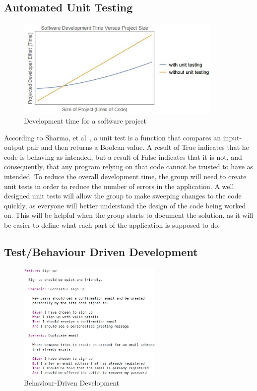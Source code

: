 \subsection{Automated Unit Testing}

\begin{figure}
  \centering
  \begin{minipage}{7cm}
    \centering
    \includegraphics[width=10cm]{inc/automated_unit_testing.jpg}
    \caption{Development time for a software project}
    \label{fig:automated_unit_testing}
  \end{minipage}
\end{figure}

According to Sharma, et al~\parencite{rep:unit_testing_validation}, a unit test is a function that compares an input-output pair and then returns a Boolean value. A result of True indicates that he code is behaving as intended, but a result of False indicates that it is not, and consequently, that any program relying on that code cannot be trusted to have as intended. To reduce the overall development time, the group will need to create unit tests in order to reduce the number of errors in the application. A well designed unit tests will allow the group to make sweeping changes to the code quickly, as everyone will better understand the design of the code being worked on. This will be helpful when the group starts to document the solution, as it will be easier to define what each part of the application is supposed to do.

\subsection{Test/Behaviour Driven Development}

\begin{figure}
  \centering
  \begin{minipage}{7cm}
    \centering
    \includegraphics[width=7cm]{inc/behaviour_driven_development.jpg}
    \caption{Behaviour-Driven Development}
    \label{fig:behaviour_driven_development}
  \end{minipage}
\end{figure}

